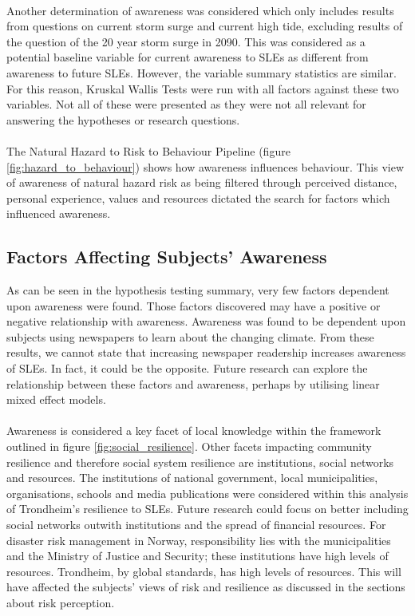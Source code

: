 \paragraph{}
Another determination of awareness was considered which only includes results from questions on current storm surge and current high tide, excluding results of the question of the 20 year storm surge in 2090. This was considered as a potential baseline variable for current awareness to SLEs as different from awareness to future SLEs. However, the variable summary statistics are similar. For this reason, Kruskal Wallis Tests were run with all factors against these two variables. Not all of these were presented as they were not all relevant for answering the hypotheses or research questions. 

\paragraph{}
The Natural Hazard to Risk to Behaviour Pipeline (figure \ref{fig:hazard_to_behaviour}) shows how awareness influences behaviour. This view of awareness of natural hazard risk as being filtered through perceived distance, personal experience, values and resources dictated the search for factors which influenced awareness. 



\subsection{Factors Affecting Subjects' Awareness}
As can be seen in the hypothesis testing summary, very few factors dependent upon awareness were found. Those factors discovered may have a positive or negative relationship with awareness. Awareness was found to be dependent upon subjects using newspapers to learn about the changing climate. From these results, we cannot state that increasing newspaper readership increases awareness of SLEs. In fact, it could be the opposite. Future research can explore the relationship between these factors and awareness, perhaps by utilising linear mixed effect models.
\paragraph{}
Awareness is considered a key facet of local knowledge within the framework outlined in figure \ref{fig:social_resilience}. Other facets impacting community resilience and therefore social system resilience are institutions, social networks and resources. The institutions of national government, local municipalities, organisations, schools and media publications were considered within this analysis of Trondheim's resilience to SLEs. Future research could focus on better including social networks outwith institutions and the spread of financial resources. For disaster risk management in Norway, responsibility lies with the municipalities and the Ministry of Justice and Security; these institutions have high levels of resources. Trondheim, by global standards, has high levels of resources. This will have affected the subjects' views of risk and resilience as discussed in the sections about risk perception. 
